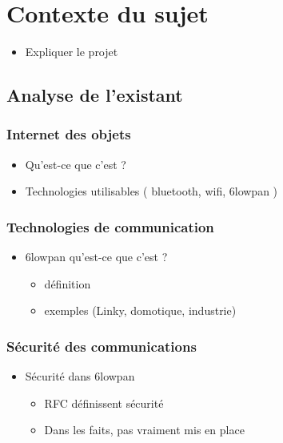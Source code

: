 \chapter{Contexte du sujet}
\label{chap:contexte}

\begin{itemize}
	\item Expliquer le projet
\end{itemize}

\section{Analyse de l'existant}
	
	\subsection{Internet des objets}
		\begin{itemize}
			\item Qu'est-ce que c'est ?	
			\item Technologies utilisables ( bluetooth, wifi, 6lowpan )
		\end{itemize}
		
	\subsection{Technologies de communication}
		\begin{itemize}
			\item 6lowpan qu'est-ce que c'est ?
			\begin{itemize}
				\item définition
				\item exemples (Linky, domotique, industrie)
			\end{itemize}
		\end{itemize}
		
	\subsection{Sécurité des communications}
		\begin{itemize}
			\item Sécurité dans 6lowpan
			\begin{itemize}
				\item RFC définissent sécurité
				\item Dans les faits, pas vraiment mis en place
			\end{itemize}
		\end{itemize}



